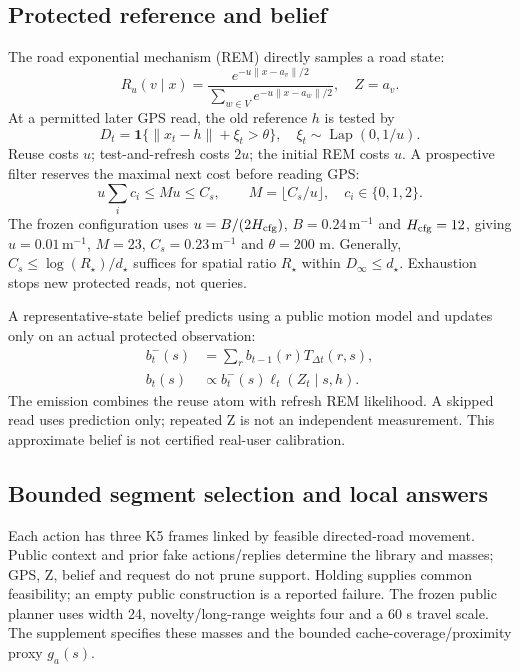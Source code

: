 \subsection{Protected reference and belief}
The road exponential mechanism (REM) directly samples a road state:
\begin{equation}
R_u(v\mid x)=
\frac{e^{-u\|x-a_v\|/2}}{\sum_{w\in V}e^{-u\|x-a_w\|/2}},
\quad Z=a_v. \label{eq:rem}
\end{equation}
At a permitted later GPS read, the old reference $h$ is tested by
\begin{equation}
D_t=\mathbf1\{\|x_t-h\|+\xi_t>\theta\},
\quad \xi_t\sim\operatorname{Lap}(0,1/u). \label{eq:test}
\end{equation}
Reuse costs $u$; test-and-refresh costs $2u$; the initial REM costs $u$.
A prospective filter reserves the maximal next cost before reading GPS:
\begin{equation}
u\sum_i c_i\le Mu\le C_s,\qquad
M=\lfloor C_s/u\rfloor,\quad c_i\in\{0,1,2\}. \label{eq:cap}
\end{equation}
The frozen configuration uses $u=B/(2H_{\rm cfg})$,
$B=0.24\,\mathrm m^{-1}$ and $H_{\rm cfg}=12$, giving $u=0.01\,\mathrm m^{-1}$,
$M=23$, $C_s=0.23\,\mathrm m^{-1}$ and $\theta=200$ m.
Generally, $C_s\le\log(R_\star)/d_\star$ suffices for spatial ratio $R_\star$
within $D_\infty\le d_\star$. Exhaustion stops new protected reads, not queries.

A representative-state belief predicts using a public motion model and updates
only on an actual protected observation:
\begin{align}
b_t^-(s)&=\sum_r b_{t-1}(r)T_{\Delta t}(r,s),\\
b_t(s)&\propto b_t^-(s)\ell_t(Z_t\mid s,h). \label{eq:belief}
\end{align}
The emission combines the reuse atom with refresh REM likelihood.
A skipped read uses prediction only; repeated Z is not an independent
measurement. This approximate belief is not certified real-user calibration.

\subsection{Bounded segment selection and local answers}
Each action has three K5 frames linked by feasible directed-road movement.
Public context and prior fake actions/replies determine the library and masses;
GPS, Z, belief and request do not prune support. Holding supplies common
feasibility; an empty public construction is a reported failure.
The frozen public planner uses width 24, novelty/long-range weights four and
a 60 s travel scale. The supplement specifies these masses and the bounded
cache-coverage/proximity proxy $g_a(s)$.

